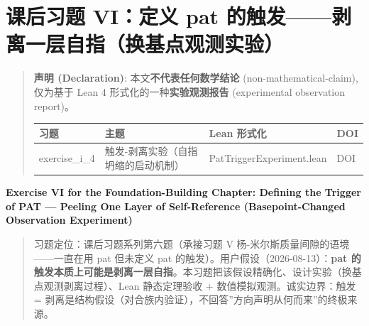 \documentclass[
]{article}
\author{}
\date{}
\newcounter{none} %
\begin{document}
\section{课后习题 VI：定义 pat
的触发------剥离一层自指（换基点观测实验）}\label{ux7b51ux57faux7bc7ux8bfeux540eux4e60ux9898-viux5b9aux4e49-pat-ux7684ux89e6ux53d1ux5265ux79bbux4e00ux5c42ux81eaux6307ux6362ux57faux70b9ux89c2ux6d4bux5b9eux9a8c}

\begin{quote}
\textbf{声明 (Declaration)}: 本文\textbf{不代表任何数学结论}
(non-mathematical-claim), 仅为基于 Lean 4
形式化的一种\textbf{实验观测报告} (experimental observation report)。

{\def\LTcaptype{none} %
\begin{longtable}[]{@{}
 >{\raggedright\arraybackslash}p{}
 >{\raggedright\arraybackslash}p{}
 >{\raggedright\arraybackslash}p{}
 >{\raggedright\arraybackslash}p{}@{}}
\toprule\noalign{}
\begin{minipage}[b]{\linewidth}\raggedright
习题
\end{minipage} & \begin{minipage}[b]{\linewidth}\raggedright
主题
\end{minipage} & \begin{minipage}[b]{\linewidth}\raggedright
Lean 形式化
\end{minipage} & \begin{minipage}[b]{\linewidth}\raggedright
DOI
\end{minipage} \\
\midrule\noalign{}
\endhead
\bottomrule\noalign{}
\endlastfoot
exercise\_i\_4 & 触发-剥离实验（自指坍缩的启动机制） &
PatTriggerExperiment.lean & DOI \\
\end{longtable}
}
\end{quote}

\textbf{Exercise VI for the Foundation-Building Chapter: Defining the
Trigger of PAT --- Peeling One Layer of Self-Reference
(Basepoint-Changed Observation Experiment)}

\begin{quote}
习题定位：课后习题系列第六题（承接习题 V
杨-米尔斯质量间隙的语境------一直在用 pat 但未定义 pat
的触发）。用户假设（2026-08-13）：\textbf{pat
的触发本质上可能是剥离一层自指}。本习题把该假设精确化、设计实验（换基点观测剥离过程）、Lean
静态定理验收 + 数值模拟观测。诚实边界：触发 =
剥离是结构假设（对合族内验证），不回答''方向声明从何而来''的终极来源。
\end{quote}
\end{document}
